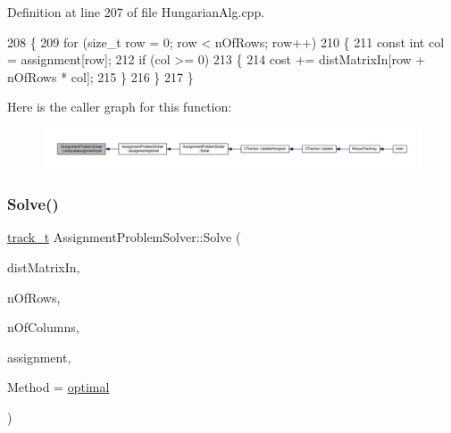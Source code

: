 Definition at line 207 of file Hungarian\+Alg.\+cpp.


\begin{DoxyCode}
208 \{
209     \textcolor{keywordflow}{for} (\textcolor{keywordtype}{size\_t} row = 0; row < nOfRows; row++)
210     \{
211         \textcolor{keyword}{const} \textcolor{keywordtype}{int} col = assignment[row];
212         \textcolor{keywordflow}{if} (col >= 0)
213         \{
214             cost += distMatrixIn[row + nOfRows * col];
215         \}
216     \}
217 \}
\end{DoxyCode}
Here is the caller graph for this function\+:\nopagebreak
\begin{figure}[H]
\begin{center}
\leavevmode
\includegraphics[width=350pt]{class_assignment_problem_solver_a978fa51f563d47dbd00c697704cf4ad9_icgraph}
\end{center}
\end{figure}
\mbox{\label{class_assignment_problem_solver_a38198467ca647403c40be2c2bb47e177}} 
\subsubsection{\texorpdfstring{Solve()}{Solve()}}
{\footnotesize\ttfamily \mbox{\hyperlink{defines_8h_a7ce9c8817b42ab418e61756f579549ab}{track\+\_\+t}} Assignment\+Problem\+Solver\+::\+Solve (\begin{DoxyParamCaption}\item[{const \mbox{\hyperlink{_hungarian_alg_8h_af6ab0ee8259a51215f62e8f96416d5bb}{dist\+Matrix\+\_\+t}} \&}]{dist\+Matrix\+In,  }\item[{size\+\_\+t}]{n\+Of\+Rows,  }\item[{size\+\_\+t}]{n\+Of\+Columns,  }\item[{\mbox{\hyperlink{_hungarian_alg_8h_ad7b9f569a9adbd958c668a36b6884ffd}{assignments\+\_\+t}} \&}]{assignment,  }\item[{\mbox{\hyperlink{class_assignment_problem_solver_aec407eb73fed9d3ddb9467fde90a85e8}{T\+Method}}}]{Method = {\ttfamily \mbox{\hyperlink{class_assignment_problem_solver_aec407eb73fed9d3ddb9467fde90a85e8a84f2334f61866dba64befa6910848d75}{optimal}}} }\end{DoxyParamCaption})}



